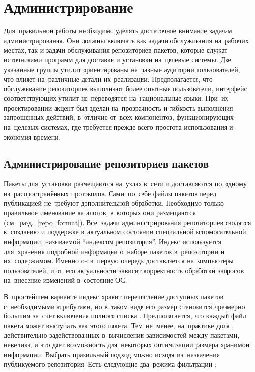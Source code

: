
\section{Администрирование \ds}

Для~правильной работы \ds необходимо уделять достаточное внимание задачам администрирования.
Они должны включать как задачи обслуживания \ds на~рабочих местах, так и задачи обслуживания репозиториев пакетов,
которые служат источниками программ для доставки и установки на~целевые системы.
Две указанные группы утилит ориентированы на~разные аудитории пользователей,
что влияет на~различные детали их~реализации.
Предполагается, что обслуживание репозиториев выполняют более опытные пользователи,
интерфейс соответствующих утилит не~переводятся на~национальные языки.
При~их проектировании акцент был зделан на~прозрачность и гибкость выполнения запрошенных действий,
в~отличие от~всех компонентов, функционирующих на~целевых системах, где требуется прежде всего простота использования и экономия времени.  

\subsection{Администрирование репозиториев пакетов}

Пакеты для~установки размещаются на~узлах в~сети и доставляются по~одному из~распространённых протоколов.
Сами~по~себе файлы пакетов перед публикацией не~требуют дополнительной обработки.
Необходимо только правильное именование каталогов, в~которых они размещаются (см.~разд.~\ref{repo_format}).
Все~задачи администрирования репозиториев сводятся к~созданию и поддержке в~актуальном состоянии специальной вспомогательной информации,
называемой ``индексом  репозитория''.
Индекс используется для~хранения подробной информации о~наборе пакетов в~репозитории и их~содержимом.
Именно он в~первую очередь доставляется  на~компьютеры пользователей,
и от~его актуальности зависит корректность обработки запросов на~внесение изменений в~состояние ОС.

В~простейшем варианте индекс хранит перечисление доступных пакетов с~необходимыми атрибутами,
но в~таком виде его размер становится чрезмерно большим за~счёт включения полного списка \provides.
Предполагается, что каждый файл пакета может выступать как \provides этого пакета.
Тем~не~менее, на~практике доля \provides, действительно задействованных в~вычислении зависимостей между пакетами, невелика,
и это даёт возможность для~некоторых оптимизаций размера хранимой информации.
Выбрать правильный подход можно исходя из~назначения публикуемого репозитория.
Есть следующие два~режима фильтрации \provides:

